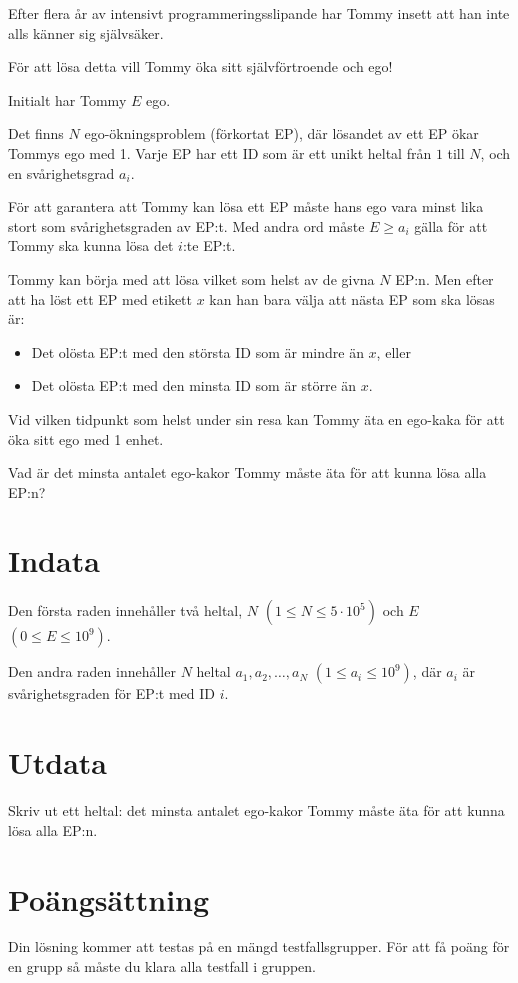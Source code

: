 \noindent

Efter flera år av intensivt programmeringsslipande har Tommy insett att han inte alls känner sig självsäker.

För att lösa detta vill Tommy öka sitt självförtroende och ego!

Initialt har Tommy $E$ ego.

Det finns $N$ ego-ökningsproblem (förkortat EP), där lösandet av ett EP ökar Tommys ego med 1.
Varje EP har ett ID som är ett unikt heltal från $1$ till $N$, och en svårighetsgrad $a_i$.

För att garantera att Tommy kan lösa ett EP måste hans ego vara minst lika stort som svårighetsgraden av EP:t.
Med andra ord måste $E \geq a_i$ gälla för att Tommy ska kunna lösa det $i$:te EP:t.

Tommy kan börja med att lösa vilket som helst av de givna $N$ EP:n.
Men efter att ha löst ett EP med etikett $x$ kan han bara välja att nästa EP som ska lösas är:
\begin{itemize}
  \item Det olösta EP:t med den största ID som är mindre än $x$, eller
  \item Det olösta EP:t med den minsta ID som är större än $x$.
\end{itemize}

Vid vilken tidpunkt som helst under sin resa kan Tommy äta en ego-kaka för att öka sitt ego med 1 enhet.

Vad är det minsta antalet ego-kakor Tommy måste äta för att kunna lösa alla EP:n?

\section*{Indata}
\noindent
Den första raden innehåller två heltal, $N$ $(1 \leq N \leq 5 \cdot 10^5)$ och $E$ $(0 \leq E \leq 10^9)$.

Den andra raden innehåller $N$ heltal $a_1, a_2, \dots, a_N$ $(1 \leq a_i \leq 10^9)$, där $a_i$ är svårighetsgraden
för EP:t med ID $i$.

\section*{Utdata}
\noindent
Skriv ut ett heltal: det minsta antalet ego-kakor Tommy måste äta för att kunna lösa alla EP:n.

\section*{Poängsättning}
Din lösning kommer att testas på en mängd testfallsgrupper.
För att få poäng för en grupp så måste du klara alla testfall i gruppen.


